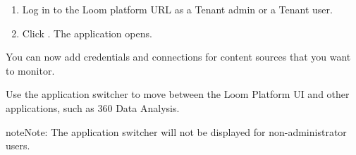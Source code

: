 \documentclass[letterpaper,10pt,english]{sphinxmanual}
\begin{document}
\begin{enumerate}
\item {} 
Log in to the Loom platform URL as a Tenant admin or a Tenant user.

\item {} 
Click . The application opens.
\begin{quote}

\begin{figure}[htbp]
\centering

\noindent{}
\end{figure}
\end{quote}

\end{enumerate}

You can now add credentials and connections for content sources that you want to monitor.

Use the application switcher to move between the Loom Platform UI and other applications, such as 360 Data Analysis.
\begin{quote}

\begin{figure}[htbp]
\centering

\noindent{}
\end{figure}
\end{quote}

\begin{sphinxadmonition}{note}{Note:}
The application switcher will not be displayed for non-administrator users.
\end{sphinxadmonition}
\end{document}
